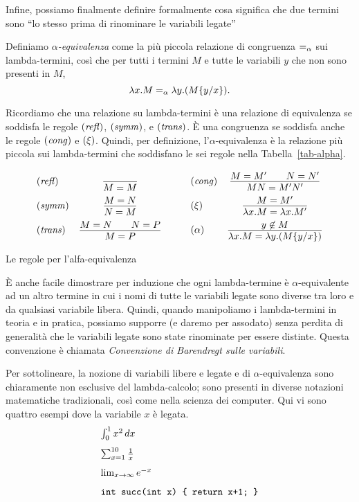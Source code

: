 \documentclass{article}
\begin{document}
Infine, possiamo finalmente definire formalmente cosa significa che due
termini sono ``lo stesso prima di rinominare le variabili legate''

\begin{definition}
  Definiamo {\em $\alpha$-equivalenza} come la pi\`u piccola relazione di congruenza 
  $=_{\alpha}$ sui lambda-termini, cos\`i che per tutti i termini $M$ e tutte le 
  variabili $y$ che non sono presenti in $M$,
  \[ \lambda x.M =_{\alpha} \lambda y.(M\{y/x\}). \]
\end{definition}


Ricordiamo che una relazione su lambda-termini \`e una relazione di equivalenza se
soddisfa le regole $\textrm{(\textit{refl\/})}$, $\textrm{(\textit{symm\/})}$, e
$\textrm{(\textit{trans\/})}$. \`E una congruenza se soddisfa anche le regole
$\textrm{(\textit{cong\/})}$ e $\textrm{(\textit{$\xi$\/})}$.  Quindi, per definizione,
l'$\alpha$-equivalenza \`e la relazione pi\`u piccola sui lambda-termini 
che soddisfano le sei regole nella Tabella~\ref{tab-alpha}.
\begin{table*}[tbp]
\[ \begin{array}{lc}
  \trule{refl} &
  \deriv{}{M=M} \nl
  \trule{symm} &
  \deriv{M=N}{N=M} \nl
  \trule{trans} &
  \deriv{M=N\sep N=P}{M=P}
\end{array} \sep
\begin{array}{lc}
  \trule{cong} &
  \deriv{M=M'\sep N=N'}{MN=M'N'} \nl
  \nrule{\xi} &
  \deriv{M=M'}{\lam x.M=\lam x.M'} \nl
  \nrule{\alpha} &
  \deriv{\mbox{$y\not\in M$}}{\lam x.M = \lam y.(\ren{M}{y}{x})}
\end{array}
\]
\caption{Le regole per l'alfa-equivalenza}
\label{tab-alpha}
\end{table*}

\`E anche facile dimostrare per induzione che ogni lambda-termine \`e
$\alpha$-equivalente ad un altro termine in cui i nomi di tutte le
variabili legate sono diverse tra loro e da qualsiasi variabile libera.
Quindi, quando manipoliamo i lambda-termini in teoria e in pratica,
possiamo supporre (e daremo per assodato) senza perdita di generalit\`a che le variabili legate
sono state rinominate per essere distinte. Questa convenzione \`e chiamata 
{\em Convenzione di Barendregt sulle variabili}.

Per sottolineare, la nozione di variabili libere e legate e di
$\alpha$-equivalenza sono chiaramente non esclusive del lambda-calcolo;
sono presenti in diverse notazioni matematiche tradizionali, cos\`i come
nella scienza dei computer. Qui vi sono quattro esempi dove la variabile $x$
\`e legata.
\[ \begin{array}{l}
  \int_0^1 x^2\,dx \nl
  \sum_{x=1}^{10}\frac{1}{x} \nl
  \lim_{x\to\infty} e^{-x} \nl
  \verb!int succ(int x) { return x+1; }!
\end{array}
\]
\end{document}
